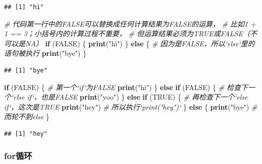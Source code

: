 \documentclass[]{book}
\newenvironment{Shaded}{\begin{snugshade}}{\end{snugshade}}
\newcommand{\CommentTok}[1]{\textcolor[rgb]{0.56,0.35,0.01}{\textit{#1}}}
\newcommand{\ControlFlowTok}[1]{\textcolor[rgb]{0.13,0.29,0.53}{\textbf{#1}}}
\newcommand{\KeywordTok}[1]{\textcolor[rgb]{0.13,0.29,0.53}{\textbf{#1}}}
\newcommand{\NormalTok}[1]{#1}
\newcommand{\OtherTok}[1]{\textcolor[rgb]{0.56,0.35,0.01}{#1}}
\newcommand{\StringTok}[1]{\textcolor[rgb]{0.31,0.60,0.02}{#1}}
\begin{document}
\begin{verbatim}
## [1] "hi"
\end{verbatim}

\begin{Shaded}
\begin{Highlighting}[]
\CommentTok{# 代码第一行中的FALSE可以替换成任何计算结果为FALSE的运算，}
\CommentTok{# 比如1 + 1 == 3；小括号内的计算过程不重要，}
\CommentTok{# 但运算结果必须为TRUE或FALSE（不可以是NA）}
\ControlFlowTok{if}\NormalTok{ (}\OtherTok{FALSE}\NormalTok{) \{ }
  \KeywordTok{print}\NormalTok{(}\StringTok{"hi"}\NormalTok{)}
\NormalTok{\} }\ControlFlowTok{else}\NormalTok{ \{ }\CommentTok{# 因为是FALSE，所以`else`里的语句被执行}
  \KeywordTok{print}\NormalTok{(}\StringTok{"bye"}\NormalTok{)}
\NormalTok{\}}
\end{Highlighting}
\end{Shaded}

\begin{verbatim}
## [1] "bye"
\end{verbatim}

\begin{Shaded}
\begin{Highlighting}[]
\ControlFlowTok{if}\NormalTok{ (}\OtherTok{FALSE}\NormalTok{) \{ }\CommentTok{# 第一个`if`为FALSE}
  \KeywordTok{print}\NormalTok{(}\StringTok{"hi"}\NormalTok{)}
\NormalTok{\} }\ControlFlowTok{else} \ControlFlowTok{if}\NormalTok{ (}\OtherTok{FALSE}\NormalTok{) \{ }\CommentTok{# 检查下一个`else if`，也是FALSE}
  \KeywordTok{print}\NormalTok{(}\StringTok{"yoo"}\NormalTok{)}
\NormalTok{\} }\ControlFlowTok{else} \ControlFlowTok{if}\NormalTok{ (}\OtherTok{TRUE}\NormalTok{) \{ }\CommentTok{# 再检查下一个`else if`，这次是TRUE}
  \KeywordTok{print}\NormalTok{(}\StringTok{"hey"}\NormalTok{) }\CommentTok{# 所以执行`print("hey")`}
\NormalTok{\} }\ControlFlowTok{else}\NormalTok{ \{}
  \KeywordTok{print}\NormalTok{(}\StringTok{"bye"}\NormalTok{) }\CommentTok{# 而轮不到else}
\NormalTok{\}}
\end{Highlighting}
\end{Shaded}

\begin{verbatim}
## [1] "hey"
\end{verbatim}

\hypertarget{for}{%
\subsubsection{for循环}\label{for}}
\end{document}
